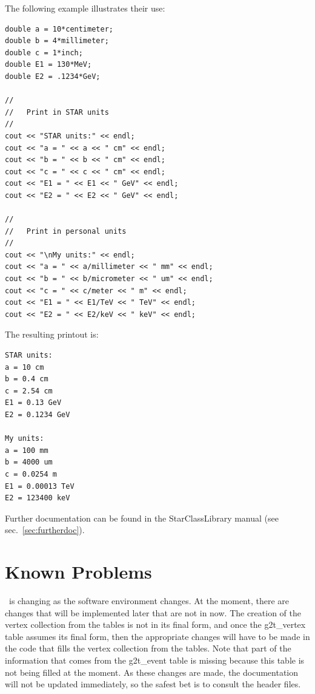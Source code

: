 The following example illustrates their use:
{\footnotesize
\begin{verbatim}
double a = 10*centimeter;
double b = 4*millimeter;
double c = 1*inch;
double E1 = 130*MeV;
double E2 = .1234*GeV;

//
//   Print in STAR units
//
cout << "STAR units:" << endl;
cout << "a = " << a << " cm" << endl;
cout << "b = " << b << " cm" << endl;
cout << "c = " << c << " cm" << endl;
cout << "E1 = " << E1 << " GeV" << endl;
cout << "E2 = " << E2 << " GeV" << endl;

//
//   Print in personal units
//
cout << "\nMy units:" << endl;
cout << "a = " << a/millimeter << " mm" << endl;
cout << "b = " << b/micrometer << " um" << endl;
cout << "c = " << c/meter << " m" << endl;
cout << "E1 = " << E1/TeV << " TeV" << endl;
cout << "E2 = " << E2/keV << " keV" << endl;
\end{verbatim}
}%
The resulting printout is:
{\footnotesize
\begin{verbatim}
STAR units:
a = 10 cm
b = 0.4 cm
c = 2.54 cm
E1 = 0.13 GeV
E2 = 0.1234 GeV

My units:
a = 100 mm
b = 4000 um
c = 0.0254 m
E1 = 0.00013 TeV
E2 = 123400 keV
\end{verbatim}
}%
Further documentation can be found in the StarClassLibrary manual
(see sec.~\ref{sec:furtherdoc}).


\section{Known Problems} 

\StMcEvent\ is changing as the software environment changes.  At the moment,
there are changes that will be implemented later that are not in now.
The creation of the vertex collection from the tables is not in its final
form, and once the g2t\_vertex table assumes its final form, then the appropriate
changes will have to be made in the code that fills the vertex collection from
the tables.  Note that part of the information that comes from the g2t\_event
table is missing because this table is not being filled at the moment.
As these changes are made, the documentation will not be updated immediately, so
the safest bet is to consult the header files.



